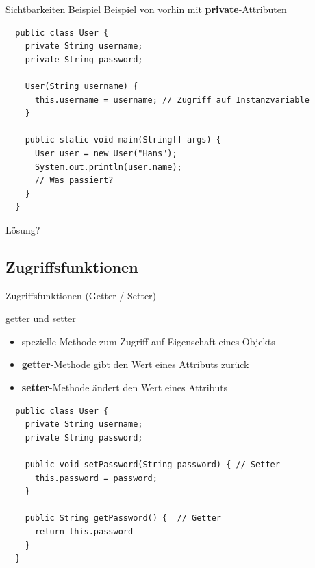 \documentclass[18pt]{beamer}
\begin{document}
\begin{frame}[fragile]{Sichtbarkeiten Beispiel}
  Beispiel von vorhin mit \textbf{private}-Attributen
  \begin{lstlisting}
  public class User {   
    private String username;
    private String password;
    
    User(String username) {
      this.username = username; // Zugriff auf Instanzvariable
    }
    
    public static void main(String[] args) {
      User user = new User("Hans");
      System.out.println(user.name);
      // Was passiert?
    }
  }\end{lstlisting}
  \pause
  Lösung?
\end{frame}

\subsection{Zugriffsfunktionen}
\begin{frame}[fragile]{Zugriffsfunktionen (Getter / Setter)}
	\begin{block}{getter und setter}
    \begin{itemize}
      \item spezielle Methode zum Zugriff auf Eigenschaft eines Objekts
      \item \textbf{getter}-Methode gibt den Wert eines Attributs zurück
      \item \textbf{setter}-Methode ändert den Wert eines Attributs
    \end{itemize}
  \end{block}
   \begin{lstlisting}
  public class User {   
    private String username;
    private String password;
    
    public void setPassword(String password) { // Setter
      this.password = password;
    }
    
    public String getPassword() {  // Getter
      return this.password
    }
  }\end{lstlisting}
\end{frame}
\end{document}
